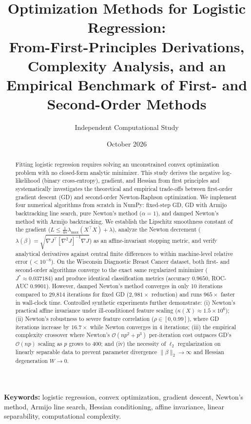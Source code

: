 \documentclass[11pt,a4paper]{article}
\title{\textbf{Optimization Methods for Logistic Regression:}\\
From-First-Principles Derivations, Complexity Analysis, and an Empirical Benchmark of First- and Second-Order Methods}
\author{Independent Computational Study}
\date{October 2026}
\theoremstyle{remark}\newtheorem{remark}{Remark}
\begin{document}
\maketitle

\begin{abstract}
Fitting logistic regression requires solving an unconstrained convex optimization problem with no closed-form analytic minimizer. This study derives the negative log-likelihood (binary cross-entropy), gradient, and Hessian from first principles and systematically investigates the theoretical and empirical trade-offs between first-order gradient descent (GD) and second-order Newton-Raphson optimization. We implement four numerical algorithms from scratch in NumPy: fixed-step GD, GD with Armijo backtracking line search, pure Newton's method ($\alpha=1$), and damped Newton's method with Armijo backtracking. We establish the Lipschitz smoothness constant of the gradient ($L \le \frac{1}{4n}\lambda_{\max}(X^\top X) + \lambda$), analyze the Newton decrement ($\lambda(\beta) = \sqrt{\nabla J^\top [\nabla^2 J]^{-1} \nabla J}$) as an affine-invariant stopping metric, and verify analytical derivatives against central finite differences to within machine-level relative error ($<10^{-8}$). On the Wisconsin Diagnostic Breast Cancer dataset, both first- and second-order algorithms converge to the exact same regularized minimizer ($J^* \approx 0.037184$) and produce identical classification metrics (accuracy $0.9650$, ROC-AUC $0.9901$). However, damped Newton's method converges in only 10 iterations compared to 29,814 iterations for fixed GD ($2,981\times$ reduction) and runs $965\times$ faster in wall-clock time. Controlled synthetic experiments further demonstrate: (i) Newton's practical affine invariance under ill-conditioned feature scaling ($\kappa(X) \approx 1.5 \times 10^6$); (ii) Newton's robustness to severe feature correlation ($\rho \in [0, 0.99]$), where GD iterations increase by $16.7\times$ while Newton converges in 4 iterations; (iii) the empirical complexity crossover where Newton's $\mathcal{O}(np^2 + p^3)$ per-iteration cost outpaces GD's $\mathcal{O}(np)$ scaling as $p$ grows to 400; and (iv) the necessity of $\ell_2$ regularization on linearly separable data to prevent parameter divergence $\|\beta\|_2 \to \infty$ and Hessian degeneration $W \to 0$.
\end{abstract}

\noindent\textbf{Keywords:} logistic regression, convex optimization, gradient descent, Newton's method, Armijo line search, Hessian conditioning, affine invariance, linear separability, computational complexity.
\end{document}
